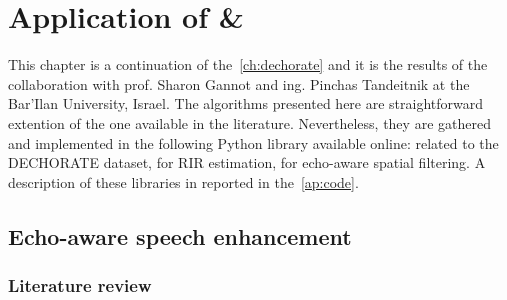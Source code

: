 \chapter{Application of \& \dEchorate}\label{ch:dechorateapp}


\vspace{-2.5em}
 \synopsisChDecharateApp



\mynewline
This chapter is a continuation of the~\cref{ch:dechorate} and it is the results of the collaboration with prof. Sharon Gannot and ing. Pinchas Tandeitnik at the Bar'Ilan University, Israel.
The algorithms presented here are straightforward extention of the one available in the literature.
Nevertheless, they are gathered and implemented in the following Python library available online:
 related to the \acs{DECHORATE} dataset,  for \acs{RIR} estimation,  for echo-aware spatial filtering.
A description of these libraries in reported in the~\cref{ap:code}.

\section{Echo-aware speech enhancement}\label{sec:dechorateapp:se}

\subsection{Literature review}

